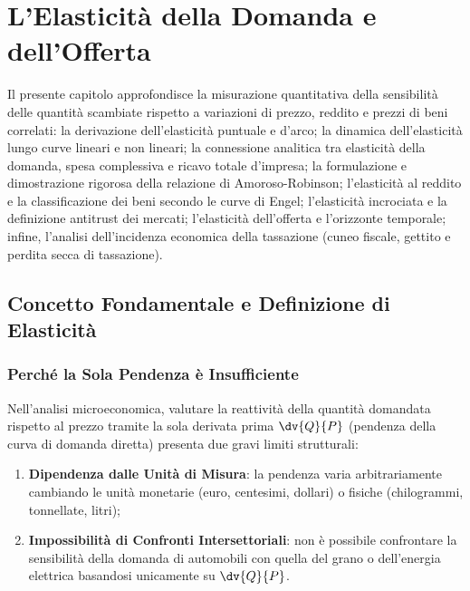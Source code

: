 \chapter{L'Elasticità della Domanda e dell'Offerta}
\label{chap:elasticita_domanda_offerta}

\begin{tcolorbox}[colback=navyblue!5!white, colframe=navyblue, title=\textbf{Quadro Concettuale e Obiettivi Didattici}]
Il presente capitolo approfondisce la misurazione quantitativa della sensibilità delle quantità scambiate rispetto a variazioni di prezzo, reddito e prezzi di beni correlati: la derivazione dell'elasticità puntuale e d'arco; la dinamica dell'elasticità lungo curve lineari e non lineari; la connessione analitica tra elasticità della domanda, spesa complessiva e ricavo totale d'impresa; la formulazione e dimostrazione rigorosa della relazione di Amoroso-Robinson; l'elasticità al reddito e la classificazione dei beni secondo le curve di Engel; l'elasticità incrociata e la definizione antitrust dei mercati; l'elasticità dell'offerta e l'orizzonte temporale; infine, l'analisi dell'incidenza economica della tassazione (cuneo fiscale, gettito e perdita secca di tassazione).
\end{tcolorbox}

\section{Concetto Fondamentale e Definizione di Elasticità}

\subsection{Perché la Sola Pendenza è Insufficiente}
Nell'analisi microeconomica, valutare la reattività della quantità domandata rispetto al prezzo tramite la sola derivata prima $\dv{Q}{P}$ (pendenza della curva di domanda diretta) presenta due gravi limiti strutturali:
\begin{enumerate}
    \item \textbf{Dipendenza dalle Unità di Misura}: la pendenza varia arbitrariamente cambiando le unità monetarie (euro, centesimi, dollari) o fisiche (chilogrammi, tonnellate, litri);
    \item \textbf{Impossibilità di Confronti Intersettoriali}: non è possibile confrontare la sensibilità della domanda di automobili con quella del grano o dell'energia elettrica basandosi unicamente su $\dv{Q}{P}$.
\end{enumerate}

